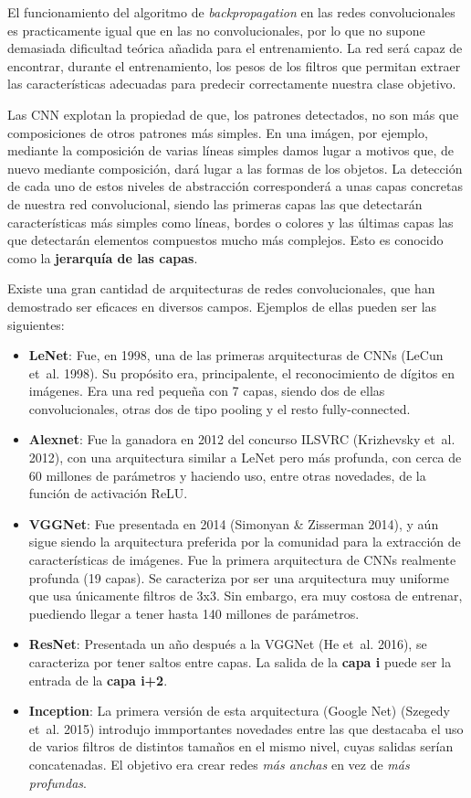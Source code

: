 \documentclass[
  12pt,
  spanish,
  a4paperpaper,
]{report}
\providecommand{\tightlist}{%
  \setlength{\itemsep}{0pt}\setlength{\parskip}{0pt}}
\begin{document}
El funcionamiento del algoritmo de \emph{backpropagation} en las redes
convolucionales es practicamente igual que en las no convolucionales,
por lo que no supone demasiada dificultad teórica añadida para el
entrenamiento. La red será capaz de encontrar, durante el entrenamiento,
los pesos de los filtros que permitan extraer las características
adecuadas para predecir correctamente nuestra clase objetivo.

Las CNN explotan la propiedad de que, los patrones detectados, no son
más que composiciones de otros patrones más simples. En una imágen, por
ejemplo, mediante la composición de varias líneas simples damos lugar a
motivos que, de nuevo mediante composición, dará lugar a las formas de
los objetos. La detección de cada uno de estos niveles de abstracción
corresponderá a unas capas concretas de nuestra red convolucional,
siendo las primeras capas las que detectarán características más simples
como líneas, bordes o colores y las últimas capas las que detectarán
elementos compuestos mucho más complejos. Esto es conocido como la
\textbf{jerarquía de las capas}.

Existe una gran cantidad de arquitecturas de redes convolucionales, que
han demostrado ser eficaces en diversos campos. Ejemplos de ellas pueden
ser las siguientes:

\begin{itemize}
\tightlist
\item
  \textbf{LeNet}: Fue, en 1998, una de las primeras arquitecturas de
  CNNs (LeCun et~al. 1998). Su propósito era, principalente, el
  reconocimiento de dígitos en imágenes. Era una red pequeña con 7
  capas, siendo dos de ellas convolucionales, otras dos de tipo pooling
  y el resto fully-connected.
\item
  \textbf{Alexnet}: Fue la ganadora en 2012 del concurso ILSVRC
  (Krizhevsky et~al. 2012), con una arquitectura similar a LeNet pero
  más profunda, con cerca de 60 millones de parámetros y haciendo uso,
  entre otras novedades, de la función de activación ReLU.
\item
  \textbf{VGGNet}: Fue presentada en 2014 (Simonyan \& Zisserman 2014),
  y aún sigue siendo la arquitectura preferida por la comunidad para la
  extracción de características de imágenes. Fue la primera arquitectura
  de CNNs realmente profunda (19 capas). Se caracteriza por ser una
  arquitectura muy uniforme que usa únicamente filtros de 3x3. Sin
  embargo, era muy costosa de entrenar, puediendo llegar a tener hasta
  140 millones de parámetros.
\item
  \textbf{ResNet}: Presentada un año después a la VGGNet (He et~al.
  2016), se caracteriza por tener saltos entre capas. La salida de la
  \textbf{capa i} puede ser la entrada de la \textbf{capa i+2}.
\item
  \textbf{Inception}: La primera versión de esta arquitectura (Google
  Net) (Szegedy et~al. 2015) introdujo immportantes novedades entre las
  que destacaba el uso de varios filtros de distintos tamaños en el
  mismo nivel, cuyas salidas serían concatenadas. El objetivo era crear
  redes \emph{más anchas} en vez de \emph{más profundas}.
\end{itemize}
\end{document}

